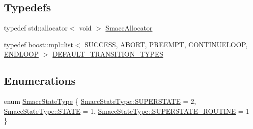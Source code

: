 \subsection*{Typedefs}
\begin{DoxyCompactItemize}
\item 
typedef std\+::allocator$<$ void $>$ \hyperlink{namespacesmacc_1_1introspection_aa4064aa24887868c6347efc004c08986}{Smacc\+Allocator}
\item 
typedef boost\+::mpl\+::list$<$ \hyperlink{structsmacc_1_1default__transition__tags_1_1SUCCESS}{S\+U\+C\+C\+E\+SS}, \hyperlink{structsmacc_1_1default__transition__tags_1_1ABORT}{A\+B\+O\+RT}, \hyperlink{structsmacc_1_1default__transition__tags_1_1PREEMPT}{P\+R\+E\+E\+M\+PT}, \hyperlink{structsmacc_1_1default__transition__tags_1_1CONTINUELOOP}{C\+O\+N\+T\+I\+N\+U\+E\+L\+O\+OP}, \hyperlink{structsmacc_1_1default__transition__tags_1_1ENDLOOP}{E\+N\+D\+L\+O\+OP} $>$ \hyperlink{namespacesmacc_1_1introspection_ac678f3918f2036c45d7d0da7f5afce83}{D\+E\+F\+A\+U\+L\+T\+\_\+\+T\+R\+A\+N\+S\+I\+T\+I\+O\+N\+\_\+\+T\+Y\+P\+ES}
\end{DoxyCompactItemize}
\subsection*{Enumerations}
\begin{DoxyCompactItemize}
\item 
enum \hyperlink{namespacesmacc_1_1introspection_a710cf406873961567c11027582c7f720}{Smacc\+State\+Type} \{ \hyperlink{namespacesmacc_1_1introspection_a710cf406873961567c11027582c7f720a4da54a31b31f1c863864fdee05fc35c8}{Smacc\+State\+Type\+::\+S\+U\+P\+E\+R\+S\+T\+A\+TE} = 2, 
\hyperlink{namespacesmacc_1_1introspection_a710cf406873961567c11027582c7f720a2b848a8cc886d253d21a77c43cd50aae}{Smacc\+State\+Type\+::\+S\+T\+A\+TE} = 1, 
\hyperlink{namespacesmacc_1_1introspection_a710cf406873961567c11027582c7f720a6d39c20504d2f2afe9c8c27351e61d20}{Smacc\+State\+Type\+::\+S\+U\+P\+E\+R\+S\+T\+A\+T\+E\+\_\+\+R\+O\+U\+T\+I\+NE} = 1
 \}
\end{DoxyCompactItemize}
